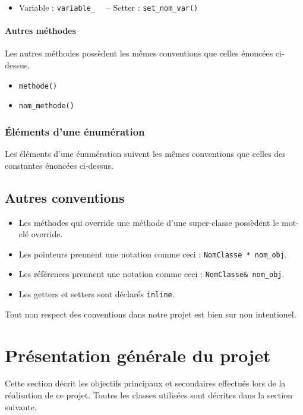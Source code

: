 \documentclass[]{report}
\begin{document}
\begin{itemize}
	\item Variable : \texttt{variable\_} ~~-- Setter : \texttt{set\_nom\_var()}
\end{itemize}

\paragraph{Autres méthodes}

Les autres méthodes possèdent les mêmes conventions que celles
énoncées ci-dessus.

\begin{itemize}
	\item \texttt{methode()}
	\item \texttt{nom\_methode()}
\end{itemize}

\subsubsection{Éléments d'une énumération} 

Les éléments d'une énumération suivent les mêmes conventions que celles des constantes énoncées ci-dessus.

\subsection{Autres conventions}

\begin{itemize}
\item Les méthodes qui override une méthode d'une super-classe possèdent le mot-clé override.
\item Les pointeurs prennent une notation comme ceci : \texttt{NomClasse * nom\_obj}.
\item Les références prennent une notation comme ceci : \texttt{NomClasse\& nom\_obj}.
\item Les getters et setters sont déclarés \texttt{inline}.
\end{itemize}

Tout non respect des conventions dans notre projet est bien sur non intentionel.

\newpage
\section{Présentation générale du projet}

Cette section décrit les objectifs principaux et secondaires effectués lors
de la réalisation de ce projet.
Toutes les classes utilisées sont décrites dans la section suivante.
\end{document}
